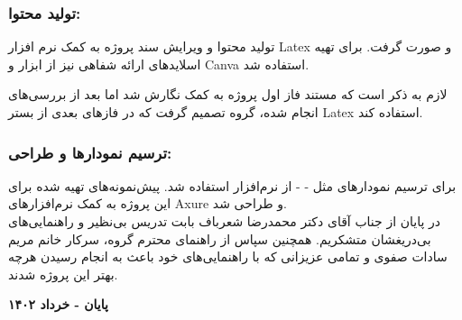 \documentclass[12pt]{article}
\begin{document}
	\subsubsection{تولید محتوا:‫‬‬}
تولید محتوا و ویرایش سند پروژه به کمک نرم افزار Latex و
 صورت گرفت. برای تهیه اسلایدهای ارائه شفاهی نیز از ابزار
   و Canva استفاده شد.

لازم به ذکر است که مستند فاز اول پروژه به کمک
 نگارش شد اما بعد از بررسی‌های انجام شده، گروه تصمیم گرفت که در فازهای بعدی از بستر Latex استفاده کند.

	\subsubsection{ترسیم نمودارها و طراحی:‫‬‬}
	برای ترسیم نمودارهای مثل
	- 
	- 
	از نرم‌افزار
	 استفاده شد.
	پیش‌نمونه‌های تهیه شده برای این پروژه به کمک نرم‌افزار‌‌های
	Axure
	و
	 طراحی شد.
	\\

	در پایان از جناب آقای دکتر محمدرضا شعرباف بابت تدریس بی‌نظیر و راهنمایی‌های بی‌دریغشان متشکریم. همچنین سپاس از راهنمای محترم گروه، سرکار خانم مریم سادات صفوی و تمامی عزیزانی که با راهنمایی‌های خود باعث به انجام رسیدن هرچه بهتر این پروژه شدند.
	\begin{flushleft}
		\textbf{پایان - خرداد ۱۴۰۲}
	\end{flushleft}
\end{document}

